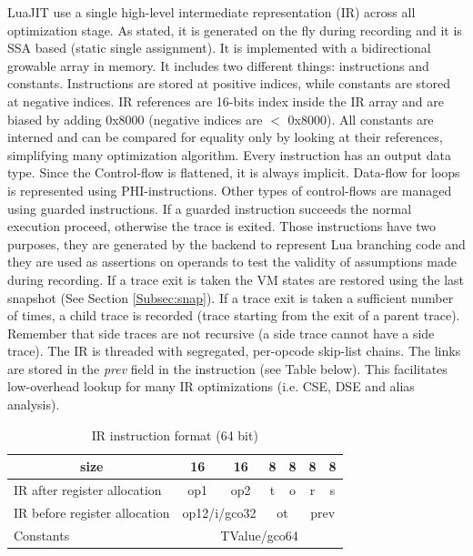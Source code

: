 LuaJIT use a single high-level intermediate representation (IR) across all
optimization stage. As stated, it is generated on the fly during recording and
it is SSA based (static single assignment). It is implemented with a
bidirectional growable array in memory. It includes two different things:
instructions and constants. Instructions are stored at positive indices, while
constants are stored at negative indices. IR references are 16-bits index inside
the IR array and are biased by adding 0x8000 (negative indices are $<$ 0x8000).
All constants are interned and can be compared for equality only by looking at
their references, simplifying many optimization algorithm. Every instruction has
an output data type. Since the Control-flow is flattened, it is always implicit.
Data-flow for loops is represented using PHI-instructions. Other types of
control-flows are managed using guarded instructions. If a guarded instruction
succeeds the normal execution proceed, otherwise the trace is exited. Those
instructions have two purposes, they are generated by the backend to represent
Lua branching code and they are used as assertions on operands to test the
validity of assumptions made during recording. If a trace exit is taken the VM
states are restored using the last snapshot (See Section \ref{Subsec:snap}). If a trace exit is taken a
sufficient number of times, a child trace is recorded
(trace starting from the exit of a parent trace). Remember that side traces are
not recursive (a side trace cannot have a side trace). The IR is threaded with
segregated, per-opcode skip-list chains. The links are stored in the \emph{prev}
field in the instruction (see Table below). This facilitates low-overhead
lookup for many IR optimizations (i.e. CSE, DSE and alias analysis).

\begin{table}[H]
\centering
\caption{IR instruction format (64 bit)}
\label{tab:ir-format}
\begin{tabular}{|l|c|c|c|c|c|c|}
\hline
\multicolumn{1}{|c|}{size}    & 16              & 16              & 8          & 8          & 8           & 8           \\ \hline
IR after register allocation  & op1             & op2             & t          & o          & r           & s           \\ \hline
IR before register allocation & \multicolumn{2}{c|}{op12/i/gco32} & \multicolumn{2}{c|}{ot} & \multicolumn{2}{c|}{prev} \\ \hline
Constants                     & \multicolumn{6}{c|}{TValue/gco64}                                                       \\ \hline
\end{tabular}
\end{table}

